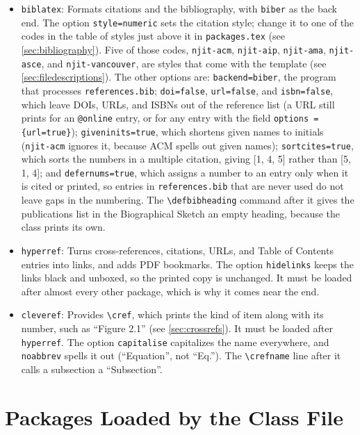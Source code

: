 \begin{itemize}
\item \texttt{biblatex}: Formats citations and the bibliography, with \texttt{biber} as the back end. The option \texttt{style=numeric} sets the citation style; change it to one of the codes in the table of styles just above it in \texttt{packages.tex} (see \cref{sec:bibliography}). Five of those codes, \texttt{njit-acm}, \texttt{njit-aip}, \texttt{njit-ama}, \texttt{njit-asce}, and \texttt{njit-vancouver}, are styles that come with the template (see \cref{sec:filedescriptions}). The other options are:
  \texttt{backend=biber}, the program that processes \texttt{references.bib};
  \texttt{doi=false}, \texttt{url=false}, and \texttt{isbn=false}, which leave DOIs, URLs, and ISBNs out of the reference list (a URL still prints for an \texttt{@online} entry, or for any entry with the field \verb+options = {url=true}+);
  \texttt{giveninits=true}, which shortens given names to initials (\texttt{njit-acm} ignores it, because ACM spells out given names);
  \texttt{sortcites=true}, which sorts the numbers in a multiple citation, giving [1, 4, 5] rather than [5, 1, 4];
  and \texttt{defernums=true}, which assigns a number to an entry only when it is cited or printed, so entries in \texttt{references.bib} that are never used do not leave gaps in the numbering.
  The \verb+\defbibheading+ command after it gives the publications list in the Biographical Sketch an empty heading, because the class prints its own.

\item \texttt{hyperref}: Turns cross-references, citations, URLs, and Table of Contents entries into links, and adds PDF bookmarks. The option \texttt{hidelinks} keeps the links black and unboxed, so the printed copy is unchanged. It must be loaded after almost every other package, which is why it comes near the end.

\item \texttt{cleveref}: Provides \verb+\cref+, which prints the kind of item along with its number, such as ``Figure 2.1'' (see \cref{sec:crossrefs}). It must be loaded after \texttt{hyperref}. The option \texttt{capitalise} capitalizes the name everywhere, and \texttt{noabbrev} spells it out (``Equation'', not ``Eq.''). The \verb+\crefname+ line after it calls a subsection a ``Subsection''.
\end{itemize}

\section{Packages Loaded by the Class File}
\label{sec:classpackages}

